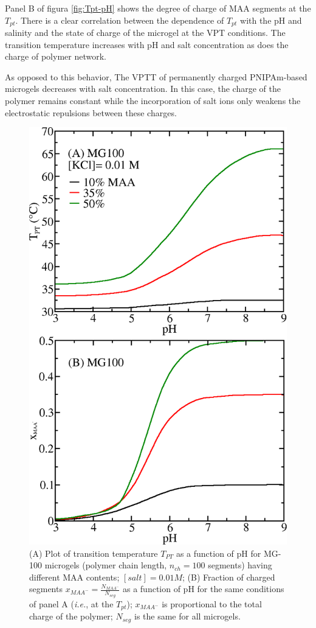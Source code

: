 Panel B of figura \ref{fig:Tpt-pH} shows the degree of charge of MAA segments at the $T_{pt}$.
There is a clear correlation between the dependence of $T_{pt}$ with the pH and salinity and the state of charge of the microgel at the VPT conditions.
The transition temperature increases with pH and salt concentration as does the charge of polymer network.

As opposed to this behavior, The VPTT of permanently charged PNIPAm-based microgels decreases with salt concentration\addcite[Lopez2020].
In this case, the charge of the polymer remains constant while the incorporation of salt ions only weakens the electrostatic repulsions between these charges.







\begin{figure}[!tb]
	\centering
	\includegraphics[width=0.5\linewidth]{Figures/graph-gel/Tpt-pH_MAA.png}
	\caption{(A) Plot of transition temperature $T_{PT}$ as a function of pH for MG-100 microgels (polymer chain length, $n_{ch}=100$ segments) having different MAA contents; $[salt]=0.01 M$;
		(B) Fraction of charged segments $x_{MAA^-}=\frac{N_{MAA^-}}{N_{seg}}$ as a function of pH for the same conditions of panel A (\emph{i.e.}, at the $T_{pt}$); $x_{MAA^-}$ is proportional to the total charge of the polymer; $N_{seg}$ is the same for all microgels.}
	\label{fig:Tpt_MAA}
\end{figure}



